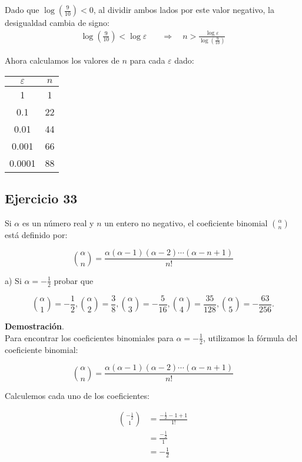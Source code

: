 \documentclass{article}
\begin{document}
    Dado que $\log \left(\frac{9}{10}\right) < 0$, al dividir ambos lados por este valor negativo, la desigualdad cambia de signo:
    \begin{align*}
    \log \left( \frac{9}{10} \right) < \log \varepsilon \quad &\Rightarrow \quad n > \frac{\log \varepsilon}{\log \left( \frac{9}{10} \right)}
    \end{align*}

    Ahora calculamos los valores de $n$ para cada $\varepsilon$ dado:

    \begin{center}
    \begin{tabular}{c|c}
    $\varepsilon$ & $n$ \\
    \hline
    1 & 1 \\
    \hline
    0.1 & 22 \\
    \hline
    0.01 & 44 \\
    \hline
    0.001 & 66 \\
    \hline
    0.0001 & 88 \\
    \end{tabular}
    \end{center}

    \subsection*{Ejercicio 33}

    Si $\alpha$ es un número real y $n$ un entero no negativo, el coeficiente binomial $\binom{\alpha}{n}$ está definido por:

    $$
    \binom{\alpha}{n}=\frac{\alpha(\alpha-1)(\alpha-2) \cdots(\alpha-n+1)}{n!}
    $$

    a) Si $\alpha=-\frac{1}{2}$ probar que

    $$
    \binom{\alpha}{1}=-\frac{1}{2},\binom{\alpha}{2}=\frac{3}{8},\binom{\alpha}{3}=-\frac{5}{16},\binom{\alpha}{4}=\frac{35}{128},\binom{\alpha}{5}=-\frac{63}{256} .
    $$

    \textbf{Demostración}.\\

    Para encontrar los coeficientes binomiales para $\alpha = -\frac{1}{2}$, utilizamos la fórmula del coeficiente binomial:

    $$
    \binom{\alpha}{n}=\frac{\alpha(\alpha-1)(\alpha-2) \cdots(\alpha-n+1)}{n!}
    $$

    Calculemos cada uno de los coeficientes:

    \begin{align*}
    \binom{-\frac{1}{2}}{1} & =\frac{-\frac{1}{2}-1+1}{1!} \\
    & =\frac{-\frac{1}{2}}{1} \\
    & =-\frac{1}{2}
    \end{align*}
\end{document}
